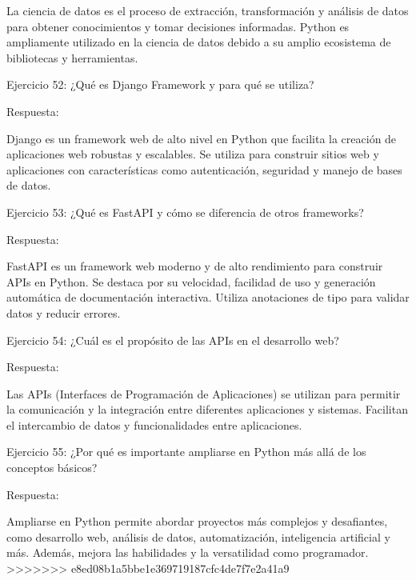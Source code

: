 \documentclass[
  a4paper,
  DIV=11,
  numbers=noendperiod,
  onepage,
  openany]{scrreprt}
\begin{document}
La ciencia de datos es el proceso de extracción, transformación y
análisis de datos para obtener conocimientos y tomar decisiones
informadas. Python es ampliamente utilizado en la ciencia de datos
debido a su amplio ecosistema de bibliotecas y herramientas.

Ejercicio 52: ¿Qué es Django Framework y para qué se utiliza?

Respuesta:

Django es un framework web de alto nivel en Python que facilita la
creación de aplicaciones web robustas y escalables. Se utiliza para
construir sitios web y aplicaciones con características como
autenticación, seguridad y manejo de bases de datos.

Ejercicio 53: ¿Qué es FastAPI y cómo se diferencia de otros frameworks?

Respuesta:

FastAPI es un framework web moderno y de alto rendimiento para construir
APIs en Python. Se destaca por su velocidad, facilidad de uso y
generación automática de documentación interactiva. Utiliza anotaciones
de tipo para validar datos y reducir errores.

Ejercicio 54: ¿Cuál es el propósito de las APIs en el desarrollo web?

Respuesta:

Las APIs (Interfaces de Programación de Aplicaciones) se utilizan para
permitir la comunicación y la integración entre diferentes aplicaciones
y sistemas. Facilitan el intercambio de datos y funcionalidades entre
aplicaciones.

Ejercicio 55: ¿Por qué es importante ampliarse en Python más allá de los
conceptos básicos?

Respuesta:

Ampliarse en Python permite abordar proyectos más complejos y
desafiantes, como desarrollo web, análisis de datos, automatización,
inteligencia artificial y más. Además, mejora las habilidades y la
versatilidad como programador.
\textgreater\textgreater\textgreater\textgreater\textgreater\textgreater\textgreater{}
e8ed08b1a5bbe1e369719187cfc4de7f7e2a41a9
\end{document}
